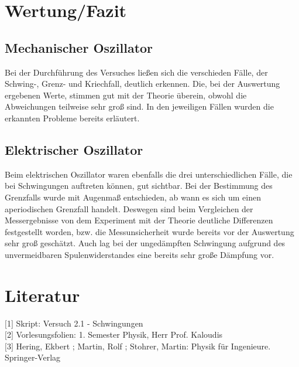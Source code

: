 \documentclass[a4paper]{scrartcl}
\numberwithin{equation}{subsection}
\begin{document}
\newpage

\section{Wertung/Fazit}
\subsection{Mechanischer Oszillator}
Bei der Durchführung des Versuches ließen sich die verschieden Fälle, der Schwing-, Grenz- und Kriechfall, deutlich erkennen. Die, bei der Auswertung ergebenen Werte, stimmen gut mit der Theorie überein, obwohl die Abweichungen teilweise sehr groß sind. In den jeweiligen Fällen wurden die erkannten Probleme bereits erläutert.

\subsection{Elektrischer Oszillator}
Beim elektrischen Oszillator waren ebenfalls die drei unterschiedlichen Fälle, die bei Schwingungen auftreten können, gut sichtbar. Bei der Bestimmung des Grenzfalls wurde mit Augenmaß entschieden, ab wann es sich um einen aperiodischen Grenzfall handelt. Deswegen sind beim Vergleichen der Messergebnisse von dem Experiment mit der Theorie deutliche Differenzen festgestellt worden, bzw. die Messunsicherheit wurde bereits vor der Auswertung sehr groß geschätzt.
Auch lag bei der ungedämpften Schwingung aufgrund des unvermeidbaren Spulenwiderstandes eine bereits sehr große Dämpfung vor.

\newpage

\section{Literatur}
$[$1$]$ Skript: Versuch 2.1 - Schwingungen \\
$[$2$]$ Vorlesungsfolien: 1. Semester Physik, Herr Prof. Kaloudis \\
$[$3$]$ Hering, Ekbert ; Martin, Rolf ; Stohrer, Martin: Physik für Ingenieure. Springer-Verlag

\label{LastPage}
\end{document}
